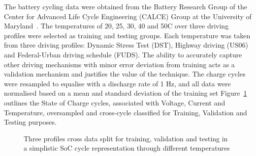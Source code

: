 %
%
{The battery cycling data were obtained from the Battery Research Group of the Center for Advanced Life Cycle Engineering (CALCE) Group at the University of Maryland~\cite{noauthor_calce_2017}.}
The temperatures of 20, 25, 30, 40 and 50\textdegree{}C over three driving profiles were selected as training and testing groups.
Each temperature was taken from three driving profiles: Dynamic Stress Test (DST), Highway driving (US06) and Federal-Urban driving schedule (FUDS).
The ability to accurately capture other driving mechanisms with minor error deviation from training acts as a validation mechanism and justifies the value of the technique.
The charge cycles were resampled to equalise with a discharge rate of 1 Hz, and all data were normalised based on a mean and standard deviation of the training set
Figure~\ref{fig:cross-data} outlines the State of Charge cycles, associated with Voltage, Current and Temperature, oversampled and cross-cycle classified for Training, Validation and Testing purposes.
\begin{figure}[ht]
    \centering
    
    \caption{Three profiles cross data split for training, validation and testing in a simplistic SoC cycle representation through different temperatures}
    \label{fig:cross-data}
\end{figure}

